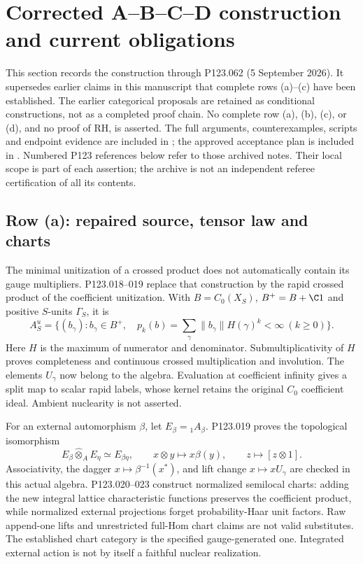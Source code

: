 \section{Corrected A--B--C--D construction and current obligations}
\label{sec:abcd-current}

This section records the construction through P123.062 (5 September 2026).
It supersedes earlier claims in this manuscript that complete rows
(a)--(c) have been established. The earlier categorical proposals are
retained as conditional constructions, not as a completed proof chain.
No complete row (a), (b), (c), or (d), and no proof of RH, is asserted.
The full arguments, counterexamples, scripts and endpoint evidence are
included in ; the approved acceptance
plan is included in .
Numbered P123 references below refer to those archived notes. Their
local scope is part of each assertion; the archive is not an independent
referee certification of all its contents.

\subsection{Row (a): repaired source, tensor law and charts}
The minimal unitization of a crossed product does not automatically
contain its gauge multipliers. P123.018--019 replace that construction by
the rapid crossed product of the coefficient unitization. With
$B=C_0(X_S)$, $B^+=B+\C1$ and positive $S$-units $\Gamma_S$, it is
\[
 A_S^u=\{(b_\gamma):b_\gamma\in B^+,\quad
 p_k(b)=\sum_\gamma\|b_\gamma\|H(\gamma)^k<\infty\ (k\ge0)\}.
\]
Here $H$ is the maximum of numerator and denominator. Submultiplicativity
of $H$ proves completeness and continuous crossed multiplication and
involution. The elements $U_\gamma$ now belong to the algebra. Evaluation
at coefficient infinity gives a split map to scalar rapid labels, whose
kernel retains the original $C_0$ coefficient ideal. Ambient nuclearity
is not asserted.

For an external automorphism $\beta$, let $E_\beta={}_1A_\beta$.
P123.019 proves the topological isomorphism
\[
 E_\beta\widehat\otimes_A E_\eta\simeq E_{\beta\eta},
 \qquad x\otimes y\longmapsto x\beta(y),
 \qquad z\longmapsto[z\otimes1].
\]
Associativity, the dagger $x\mapsto\beta^{-1}(x^*)$, and lift change
$x\mapsto xU_\gamma$ are checked in this actual algebra.
P123.020--023 construct normalized semilocal charts: adding the new
integral lattice characteristic functions preserves the coefficient
product, while normalized external projections forget probability-Haar
unit factors. Raw append-one lifts and unrestricted full-Hom chart
claims are not valid substitutes. The established chart category is
the specified gauge-generated one. Integrated external action is not
by itself a faithful nuclear realization.

